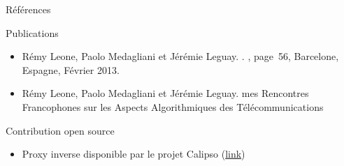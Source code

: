 \begin{frame}{Références}
  \begin{alertblock}{Publications}
    \begin{itemize}
      \item Rémy Leone, Paolo Medagliani et Jérémie Leguay.
        .
        , page~56, Barcelone, Espagne, Février 2013.

      \item Rémy Leone, Paolo Medagliani et Jérémie Leguay.
        mes Rencontres Francophones sur les Aspects Algorithmiques des T{\'e}l{\'e}communications

    \end{itemize}

  \end{alertblock}

  \begin{block}{Contribution open source}
    \begin{itemize}
      \item Proxy inverse disponible par le projet Calipso (\href{https://github.com/sics-iot/calipso}{link})
    \end{itemize}
  \end{block}
\end{frame}
